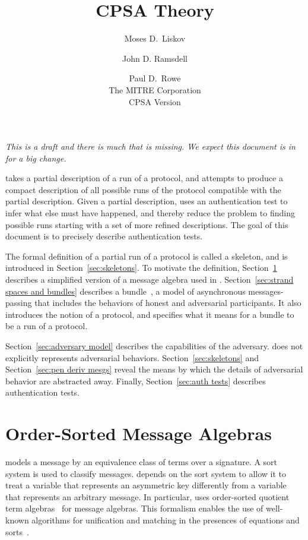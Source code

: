 \documentclass[12pt]{article}
\title{CPSA Theory}
\author{Moses D.~Liskov\and John D. Ramsdell\and Paul D.~Rowe\\
  The MITRE Corporation\\ CPSA Version \version}
\theoremstyle{definition}
\begin{document}
\maketitle
\cpsacopying

\emph{This is a draft and there is much that is missing.  We
  expect this document is in for a big change.}

{\cpsa} takes a partial description of a run of a protocol, and
attempts to produce a compact description of all possible runs of the
protocol compatible with the partial description.  Given a partial
description, {\cpsa} uses an authentication test to infer what else
must have happened, and thereby reduce the problem to finding possible
runs starting with a set of more refined descriptions.  The goal of
this document is to precisely describe authentication tests.

The formal definition of a partial run of a protocol is called a
skeleton, and is introduced in Section~\ref{sec:skeletons}.  To
motivate the definition, Section~\ref{sec:order-sorted mesg algs}
describes a simplified version of a message algebra used in {\cpsa}.
Section~\ref{sec:strand spaces and bundles} describes a
bundle~\cite{ThayerEtal99,GuttmanThayer02}, a model of asynchronous
messages-passing that includes the behaviors of honest and adversarial
participants.  It also introduces the notion of a protocol, and
specifies what it means for a bundle to be a run of a protocol.

Section~\ref{sec:adversary model} describes the capabilities of the
adversary.  {\cpsa} does not explicitly represents adversarial
behaviors.  Section~\ref{sec:skeletons} and Section~\ref{sec:pen deriv
  mesgs} reveal the means by which the details of adversarial
behavior are abstracted away.  Finally, Section~\ref{sec:auth tests}
describes authentication tests.

\section{Order-Sorted Message Algebras}\label{sec:order-sorted mesg algs}

{\cpsa} models a message by an equivalence class of terms over a
signature. A sort system is used to classify messages.  {\cpsa}
depends on the sort system to allow it to treat a variable that
represents an asymmetric key differently from a variable that
represents an arbitrary message.  In particular, {\cpsa} uses
order-sorted quotient term algebras~\cite{GoguenMeseguer92} for
message algebras.  This formalism enables the use of well-known
algorithms for unification and matching in the presences of equations
and sorts~\cite[Chapter~8]{RobinsonVoronkov01}.
\end{document}
